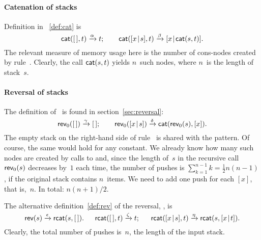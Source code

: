 \paragraph{Catenation of stacks}

Definition in \fig~\vref{def:cat} is
\begin{equation*}
\textsf{cat}(        [\,],t) \xrightarrow{\smash{\alpha}} t;\qquad
\textsf{cat}([{x}\!\mid\!{s}],t) \xrightarrow{\smash{\beta}}
                                 [{x}\!\mid\!{\textsf{cat}(s,t)}].
\end{equation*}
The relevant measure of memory usage here is the number of cons\hyp{}nodes created by rule~\clause{\beta}. Clearly, the call \(\textsf{cat}(s,t)\) yields \(n\)~such nodes, where \(n\)~is the length of stack~\(s\).

\paragraph{Reversal of stacks}

The definition of~ is found in
section~\ref{sec:reversal}:
\begin{equation*}
\textsf{rev}_0([\,]) \xrightarrow{\smash{\gamma}} [\,];\qquad
\textsf{rev}_0([{x}\!\mid\!{s}]) \xrightarrow{\smash{\delta}}
                         \textsf{cat}(\textsf{rev}_0(s),[x]).
\end{equation*}
The empty stack on the right\hyp{}hand side of rule~\clause{\gamma} is
shared with the pattern. Of course, the same would hold for any
constant. We already know how many such nodes are created by calls to
 and, since the length of~\(s\) in the recursive call
\(\textsf{rev}_0(s)\) decreases by~\(1\) each time, the number of pushes
is \(\sum_{k=1}^{n-1}k = \tfrac{1}{2}n(n-1)\), if the original stack
contains \(n\)~items. We need to add one push for each \([x]\), that
is,~\(n\). In total: \(n(n+1)/2\).

The alternative definition~\eqref{def:rev} of the reversal,
, is
\begin{equation*}
\textsf{rev}(s) \xrightarrow{\smash{\epsilon}} \textsf{rcat}(s,[\,]).\quad\;\;
\textsf{rcat}([\,],t) \xrightarrow{\smash{\zeta}} t;\quad\;\;
\textsf{rcat}([{x}\!\mid\!{s}],t) \xrightarrow{\smash{\eta}} 
                          \textsf{rcat}(s,[{x}\!\mid\!{t}]).
\end{equation*}
Clearly, the total number of pushes is~\(n\), the length of the input
stack.


